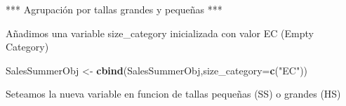 \documentclass[
]{article}
\newenvironment{Shaded}{\begin{snugshade}}{\end{snugshade}}
\newcommand{\DataTypeTok}[1]{\textcolor[rgb]{0.13,0.29,0.53}{#1}}
\newcommand{\KeywordTok}[1]{\textcolor[rgb]{0.13,0.29,0.53}{\textbf{#1}}}
\newcommand{\NormalTok}[1]{#1}
\newcommand{\OperatorTok}[1]{\textcolor[rgb]{0.81,0.36,0.00}{\textbf{#1}}}
\newcommand{\StringTok}[1]{\textcolor[rgb]{0.31,0.60,0.02}{#1}}
\begin{document}
\begin{Shaded}
\end{Shaded}

*** Agrupación por tallas grandes y pequeñas ***

Añadimos una variable size\_category inicializada con valor EC (Empty
Category)

\begin{Shaded}
\begin{Highlighting}[]
\NormalTok{SalesSummerObj <-}\StringTok{ }\KeywordTok{cbind}\NormalTok{(SalesSummerObj,}\DataTypeTok{size_category=}\KeywordTok{c}\NormalTok{(}\StringTok{"EC"}\NormalTok{))}
\end{Highlighting}
\end{Shaded}

Seteamos la nueva variable en funcion de tallas pequeñas (SS) o grandes
(HS)
\end{document}
